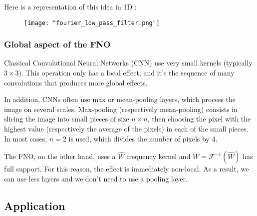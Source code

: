 Here is a representation of this idea in 1D :

\begin{figure}[H]
	\centering
	\texttt{[image: "fourier\_low\_pass\_filter.png"]}
\end{figure}

\subsubsection{Global aspect of the FNO}

Classical Convolutional Neural Networks (CNN) use very small kernels (typically $3\times 3$). This operation only has a local effect, and it's the sequence of many convolutions that produces more global effects. 

In addition, CNNs often use max or mean-pooling layers, which process the image on several scales. Max-pooling (respectively mean-pooling) consists in slicing the image into small pieces of size $n\times n$, then choosing the pixel with the highest value (respectively the average of the pixels) in each of the small pieces. In most cases, $n=2$ is used, which divides the number of pixels by 4.

The FNO, on the other hand, uses a $\hat{W}$ frequency kernel and $W=\mathcal{F}^{-1}(\hat{W})$ has full support. For this reason, the effect is immediately non-local. As a result, we can use less layers and we don't need to use a pooling layer.
\subsection{Application}

